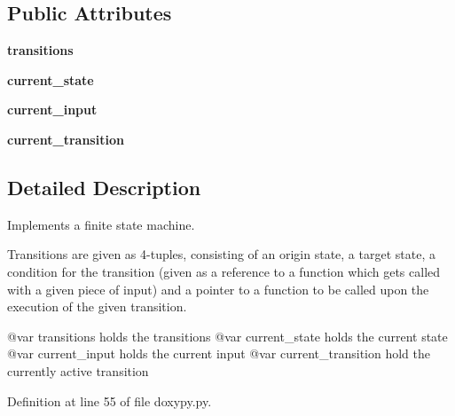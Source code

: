 \subsection*{Public Attributes}
\begin{DoxyCompactItemize}
\item 
\hypertarget{classmitgcm_1_1doxypy_1_1FSM_ae8271cc88a9b69b2593e13f4c9d40360}{{\bfseries transitions}}\label{classmitgcm_1_1doxypy_1_1FSM_ae8271cc88a9b69b2593e13f4c9d40360}

\item 
\hypertarget{classmitgcm_1_1doxypy_1_1FSM_a9a1df0839075f97f6b10fbaa1792429e}{{\bfseries current\+\_\+state}}\label{classmitgcm_1_1doxypy_1_1FSM_a9a1df0839075f97f6b10fbaa1792429e}

\item 
\hypertarget{classmitgcm_1_1doxypy_1_1FSM_ac21181e14d4da41507ba1d5b7bebf461}{{\bfseries current\+\_\+input}}\label{classmitgcm_1_1doxypy_1_1FSM_ac21181e14d4da41507ba1d5b7bebf461}

\item 
\hypertarget{classmitgcm_1_1doxypy_1_1FSM_a702a4f1c34b8c0f072818cc240232c51}{{\bfseries current\+\_\+transition}}\label{classmitgcm_1_1doxypy_1_1FSM_a702a4f1c34b8c0f072818cc240232c51}

\end{DoxyCompactItemize}


\subsection{Detailed Description}
Implements a finite state machine. 

Transitions are given as 4-\/tuples, consisting of an origin state, a target state, a condition for the transition (given as a reference to a function which gets called with a given piece of input) and a pointer to a function to be called upon the execution of the given transition. \begin{DoxyVerb}@var transitions holds the transitions
@var current_state holds the current state
@var current_input holds the current input
@var current_transition hold the currently active transition
\end{DoxyVerb}
 

Definition at line 55 of file doxypy.\+py.



